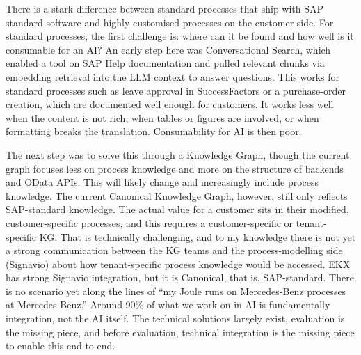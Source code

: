 \medskip{}

There is a stark difference between standard processes that ship with SAP standard software and highly customised processes on the customer side. For standard processes, the first challenge is: where can it be found and how well is it consumable for an AI? An early step here was Conversational Search, which enabled a tool on SAP Help documentation and pulled relevant chunks via embedding retrieval into the LLM context to answer questions. This works for standard processes such as leave approval in SuccessFactors or a purchase-order creation, which are documented well enough for customers. It works less well when the content is not rich, when tables or figures are involved, or when formatting breaks the translation. Consumability for AI is then poor.

The next step was to solve this through a Knowledge Graph, though the current graph focuses less on process knowledge and more on the structure of backends and OData APIs. This will likely change and increasingly include process knowledge. The current Canonical Knowledge Graph, however, still only reflects SAP-standard knowledge. The actual value for a customer sits in their modified, customer-specific processes, and this requires a customer-specific or tenant-specific KG. That is technically challenging, and to my knowledge there is not yet a strong communication between the KG teams and the process-modelling side (Signavio) about how tenant-specific process knowledge would be accessed. EKX has strong Signavio integration, but it is Canonical, that is, SAP-standard. There is no scenario yet along the lines of ``my Joule runs on Mercedes-Benz processes at Mercedes-Benz.'' Around 90\% of what we work on in AI is fundamentally integration, not the AI itself. The technical solutions largely exist, evaluation is the missing piece, and before evaluation, technical integration is the missing piece to enable this end-to-end.

\medskip{}

